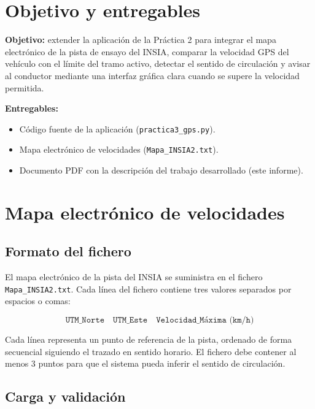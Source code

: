 \documentclass[10pt]{article}
\begin{document}
\section{Objetivo y entregables}

\textbf{Objetivo:} extender la aplicación de la Práctica 2 para integrar el mapa electrónico de la pista de ensayo del INSIA, comparar la velocidad GPS del vehículo con el límite del tramo activo, detectar el sentido de circulación y avisar al conductor mediante una interfaz gráfica clara cuando se supere la velocidad permitida.

\textbf{Entregables:}
\begin{itemize}[leftmargin=1.2em]
    \item Código fuente de la aplicación (\texttt{practica3\_gps.py}).
    \item Mapa electrónico de velocidades (\texttt{Mapa\_INSIA2.txt}).
    \item Documento PDF con la descripción del trabajo desarrollado (este informe).
\end{itemize}

\section{Mapa electrónico de velocidades}

\subsection{Formato del fichero}

El mapa electrónico de la pista del INSIA se suministra en el fichero \texttt{Mapa\_INSIA2.txt}. Cada línea del fichero contiene tres valores separados por espacios o comas:

\[
\texttt{UTM\_Norte} \quad \texttt{UTM\_Este} \quad \texttt{Velocidad\_Máxima (km/h)}
\]

Cada línea representa un punto de referencia de la pista, ordenado de forma secuencial siguiendo el trazado en sentido horario. El fichero debe contener al menos 3 puntos para que el sistema pueda inferir el sentido de circulación.

\subsection{Carga y validación}
\end{document}
